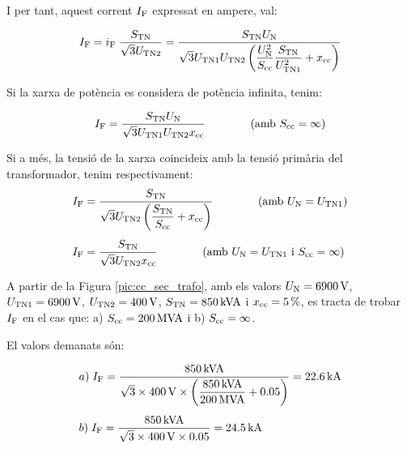 I per tant, aquest corrent $I_\mathrm{F}$ expressat en ampere, val:

\begin{equation}
    I_\mathrm{F} = i_\mathrm{F}\; \frac{S_\mathrm{TN}}{\sqrt{3}U_\mathrm{TN2}} =
    \frac{S_\mathrm{TN} U_\mathrm{N}}{\sqrt{3} U_\mathrm{TN1}U_\mathrm{TN2}
    \left(\dfrac{U_\mathrm{N}^2}{S_\mathrm{cc}}
    \dfrac{S_\mathrm{TN}}{U_\mathrm{TN1}^2} + x_\mathrm{cc}\right)}
\end{equation}

Si la xarxa de potència es considera de potència infinita, tenim:

\begin{equation}
    I_\mathrm{F} = \frac{S_\mathrm{TN} U_\mathrm{N}}{\sqrt{3} U_\mathrm{TN1}U_\mathrm{TN2}
    x_\mathrm{cc}}\qquad\qquad (\text{amb }S_\mathrm{cc}=\infty)
\end{equation}

Si a més, la tensió de la xarxa coincideix amb la tensió primària
del transformador, tenim respectivament:
\begin{align}
    I_\mathrm{F} &= \frac{S_\mathrm{TN}}{\sqrt{3} U_\mathrm{TN2}
    \left(\dfrac{S_\mathrm{TN}}{S_\mathrm{cc}} +
    x_\mathrm{cc}\right)}\qquad\qquad(\text{amb }U_\mathrm{N}=U_\mathrm{TN1})\\[1ex]
    I_\mathrm{F} &= \frac{S_\mathrm{TN}}{\sqrt{3} U_\mathrm{TN2}
    x_\mathrm{cc}}\qquad\qquad(\text{amb }U_\mathrm{N}=U_\mathrm{TN1}\text{ i }
    S_\mathrm{cc}=\infty)
\end{align}

\begin{exemple}
    A partir de la Figura \vref{pic:cc_sec_trafo}, amb els valors
    $U_\mathrm{N}=\SI{6900}{V}$, $U_\mathrm{TN1}=\SI{6900}{V}$,
    $U_\mathrm{TN2}=\SI{400}{V}$, $S_\mathrm{TN}=\SI{850}{kVA}$ i
    $x_\mathrm{cc}=\SI{5}{\%}$, es tracta de trobar $I_\mathrm{F}$ en el cas
    que: a) $S_\mathrm{cc}=\SI{200}{MVA}$ i b) $S_\mathrm{cc}=\infty$.

    El valors demanats són:

    \begin{align*}
       &a)\;I_\mathrm{F} = \frac{\SI{850}{kVA}}{\sqrt{3}\times \SI{400}{V}\times
       \left(\dfrac{\SI{850}{kVA}}{\SI{200}{MVA}} +
       \num{0,05}\right)} = \SI{22,6}{kA} \\[1ex]
       &b)\;I_\mathrm{F} = \frac{\SI{850}{kVA}}{\sqrt{3}\times \SI{400}{V}\times
       \num{0,05}} = \SI{24,5}{kA}
    \end{align*}

\end{exemple}



